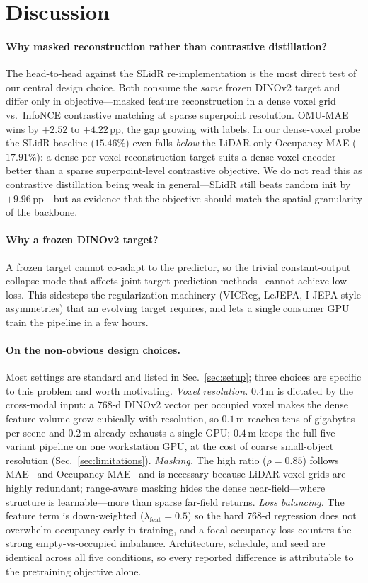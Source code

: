 \section{Discussion}

\paragraph{Why masked reconstruction rather than contrastive distillation?}
The head-to-head against the SLidR re-implementation is the most direct
test of our central design choice. Both consume the \emph{same} frozen
DINOv2 target and differ only in objective---masked feature reconstruction
in a dense voxel grid vs.\ InfoNCE contrastive matching at sparse
superpoint resolution. OMU-MAE wins by $+2.52$ to $+4.22$\,pp, the gap
growing with labels. In our dense-voxel probe the SLidR baseline
($15.46\%$) even falls \emph{below} the LiDAR-only Occupancy-MAE
($17.91\%$): a dense per-voxel reconstruction target suits a dense voxel
encoder better than a sparse superpoint-level contrastive objective. We do
not read this as contrastive distillation being weak in general---SLidR
still beats random init by $+9.96$\,pp---but as evidence that the objective
should match the spatial granularity of the backbone.

\paragraph{Why a frozen DINOv2 target?}
A frozen target cannot co-adapt to the predictor, so the trivial
constant-output collapse mode that affects joint-target prediction
methods~\cite{ijepa,lejepa} cannot achieve low loss. This sidesteps the
regularization machinery (VICReg, LeJEPA, I-JEPA-style asymmetries) that an
evolving target requires, and lets a single consumer GPU train the pipeline
in a few hours.

\paragraph{On the non-obvious design choices.}
Most settings are standard and listed in Sec.~\ref{sec:setup}; three choices
are specific to this problem and worth motivating. \emph{Voxel resolution.}
$0.4$\,m is dictated by the cross-modal input: a $768$-d DINOv2 vector per
occupied voxel makes the dense feature volume grow cubically with
resolution, so $0.1$\,m reaches tens of gigabytes per scene and $0.2$\,m
already exhausts a single GPU; $0.4$\,m keeps the full five-variant pipeline
on one workstation GPU, at the cost of coarse small-object resolution
(Sec.~\ref{sec:limitations}). \emph{Masking.} The high ratio
($\rho{=}0.85$) follows MAE~\cite{mae} and Occupancy-MAE~\cite{occmae} and is
necessary because LiDAR voxel grids are highly redundant; range-aware
masking hides the dense near-field---where structure is learnable---more
than sparse far-field returns. \emph{Loss balancing.} The feature term is
down-weighted ($\lambda_{\text{feat}}{=}0.5$) so the hard $768$-d regression
does not overwhelm occupancy early in training, and a focal occupancy loss
counters the strong empty-vs-occupied imbalance. Architecture, schedule, and
seed are identical across all five conditions, so every reported difference
is attributable to the pretraining objective alone.
